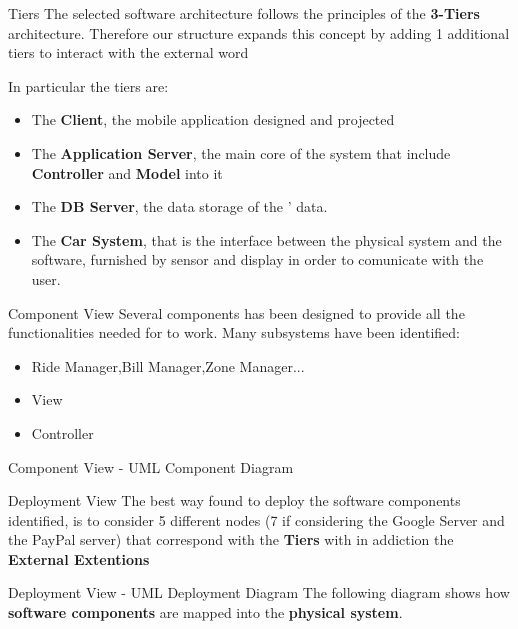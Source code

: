 \documentclass{../Common/Structure/pdf_presentation}
\begin{document}
	\begin{frame}{Tiers}
		The selected software architecture follows the principles of the \textbf{3-Tiers} architecture. Therefore our structure expands this concept by adding 1 additional tiers to interact with the external word\par
		In particular the tiers are:
		\begin{itemize}
			\item The \textbf{Client}, the mobile application designed and projected
			\item The \textbf{Application Server}, the main core of the system that include \textbf{Controller} and \textbf{Model} into it
			\item The \textbf{DB Server}, the data storage of the \PowerEnJoy{}' data.
			\item The \textbf{Car System}, that is the interface between the physical system and the software, furnished by sensor and display in order to comunicate with the user.
		\end{itemize}
	\end{frame}
	\begin{frame}{Component View}
		Several components has been designed to provide all the functionalities needed for \PowerEnJoy{} to work.
		Many subsystems have been identified:
		\begin{itemize}
			\item Ride Manager,Bill Manager,Zone Manager...
			\item View
			\item Controller
		\end{itemize}
	\end{frame}
	\begin{frame}{Component View - UML Component Diagram}
	\end{frame}
	\begin{frame}{Deployment View}
			The best way found to deploy the software components identified, is to consider 5 different nodes (7 if considering the Google Server and the
			PayPal server) that correspond with the \textbf{Tiers} with in addiction the \textbf{External Extentions}
	\end{frame}
	\begin{frame}{Deployment View - UML Deployment Diagram}
		The following diagram shows how \textbf{software components} are mapped into the \textbf{physical system}.
	\end{frame}
\end{document}
